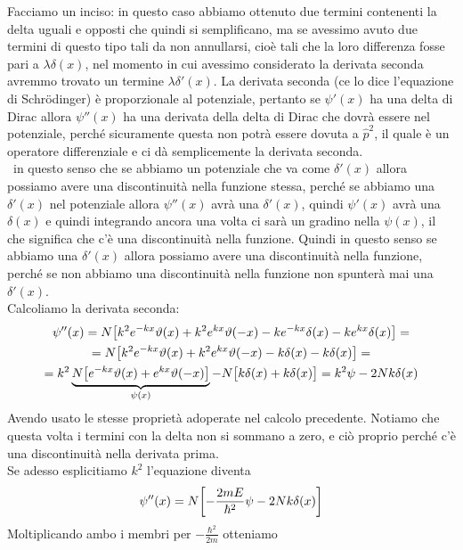 \begin{soluzione}
   Facciamo un inciso: in questo caso abbiamo ottenuto due termini contenenti la delta uguali e opposti che quindi si semplificano, ma se avessimo avuto due termini di questo tipo tali da non annullarsi, cioè tali che la loro differenza fosse pari a $\lambda\delta(x)$, nel momento in cui avessimo considerato la derivata seconda avremmo trovato un termine $\lambda\delta'(x)$. La derivata seconda (ce lo dice l'equazione di Schrödinger) è proporzionale al potenziale, pertanto se $\psi'(x)$ ha una delta di Dirac allora $\psi''(x)$ ha una derivata della delta di Dirac che dovrà essere nel potenziale, perché sicuramente questa non potrà essere dovuta a $\hat{p}^2$, il quale è un operatore differenziale e ci dà semplicemente la derivata seconda.\\
   \E\ in questo senso che se abbiamo un potenziale che va come $\delta'(x)$ allora possiamo avere una discontinuità nella funzione stessa, perché se abbiamo una $\delta'(x)$ nel potenziale allora $\psi''(x)$ avrà una $\delta'(x)$, quindi $\psi'(x)$ avrà una $\delta(x)$ e quindi integrando ancora una volta ci sarà un gradino nella $\psi(x)$, il che significa che c'è una discontinuità nella funzione. Quindi in questo senso se abbiamo una $\delta'(x)$ allora possiamo avere una discontinuità nella funzione, perché se non abbiamo una discontinuità nella funzione non spunterà mai una $\delta'(x)$.\\
   Calcoliamo la derivata seconda:
   \begin{gather*}
      \psi''(x)
      =N\qty[ k^2e^{-kx}\vartheta(x) +
      k^2e^{kx}\vartheta(-x) - ke^{-kx}\delta(x) - ke^{kx}\delta(x) ]=
      \\
      =N\big[ k^2e^{-kx}\vartheta(x) + k^2e^{kx}\vartheta(-x) - k\delta(x) - k\delta(x) \big]=
      \\
      =k^2 \underbrace{N\big[ e^{-kx}\vartheta(x) + e^{kx}\vartheta(-x) \big] }_{\psi(x)}- N \big[ k\delta(x) + k\delta(x) \big]
      =k^2\psi - 2Nk\delta(x)
   \end{gather*}
   Avendo usato le stesse proprietà adoperate nel calcolo precedente. Notiamo che questa volta i termini con la delta non si sommano a zero, e ciò proprio perché c'è una discontinuità nella derivata prima.\\
   Se adesso esplicitiamo $k^2$ l'equazione diventa
   \begin{equation*}
      \psi''(x)=N\qty[ -\frac{2mE}{\hbar^2}\psi - 2Nk\delta(x) ]
   \end{equation*}
   Moltiplicando ambo i membri per $-\frac{\hbar^2}{2m}$ otteniamo

\end{soluzione}
